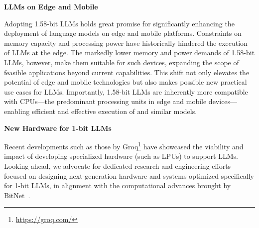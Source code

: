 \textbf{LLMs on Edge and Mobile}

Adopting 1.58-bit LLMs holds great promise for significantly enhancing the deployment of language models on edge and mobile platforms. Constraints on memory capacity and processing power have historically hindered the execution of LLMs at the edge. The markedly lower memory and power demands of 1.58-bit LLMs, however, make them suitable for such devices, expanding the scope of feasible applications beyond current capabilities. This shift not only elevates the potential of edge and mobile technologies but also makes possible new practical use cases for LLMs. Importantly, 1.58-bit LLMs are inherently more compatible with CPUs—the predominant processing units in edge and mobile devices—enabling efficient and effective execution of  and similar models.

\textbf{New Hardware for 1-bit LLMs}

Recent developments such as those by Groq\footnote{\url{https://groq.com/}} have showcased the viability and impact of developing specialized hardware (such as LPUs) to support LLMs. Looking ahead, we advocate for dedicated research and engineering efforts focused on designing next-generation hardware and systems optimized specifically for 1-bit LLMs, in alignment with the computational advances brought by BitNet~\cite{bitnet}.